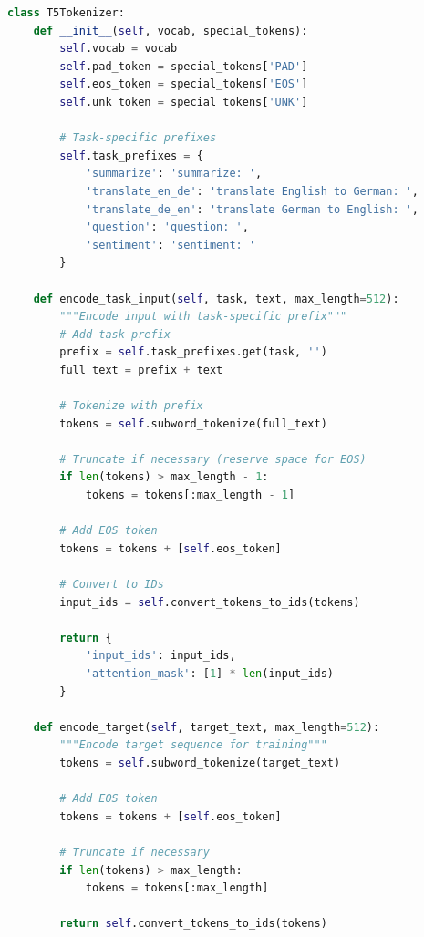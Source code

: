 \begin{lstlisting}[language=Python, caption=T5-style task prefix insertion]
class T5Tokenizer:
    def __init__(self, vocab, special_tokens):
        self.vocab = vocab
        self.pad_token = special_tokens['PAD']
        self.eos_token = special_tokens['EOS']
        self.unk_token = special_tokens['UNK']
        
        # Task-specific prefixes
        self.task_prefixes = {
            'summarize': 'summarize: ',
            'translate_en_de': 'translate English to German: ',
            'translate_de_en': 'translate German to English: ',
            'question': 'question: ',
            'sentiment': 'sentiment: '
        }
    
    def encode_task_input(self, task, text, max_length=512):
        """Encode input with task-specific prefix"""
        # Add task prefix
        prefix = self.task_prefixes.get(task, '')
        full_text = prefix + text
        
        # Tokenize with prefix
        tokens = self.subword_tokenize(full_text)
        
        # Truncate if necessary (reserve space for EOS)
        if len(tokens) > max_length - 1:
            tokens = tokens[:max_length - 1]
        
        # Add EOS token
        tokens = tokens + [self.eos_token]
        
        # Convert to IDs
        input_ids = self.convert_tokens_to_ids(tokens)
        
        return {
            'input_ids': input_ids,
            'attention_mask': [1] * len(input_ids)
        }
    
    def encode_target(self, target_text, max_length=512):
        """Encode target sequence for training"""
        tokens = self.subword_tokenize(target_text)
        
        # Add EOS token
        tokens = tokens + [self.eos_token]
        
        # Truncate if necessary
        if len(tokens) > max_length:
            tokens = tokens[:max_length]
            
        return self.convert_tokens_to_ids(tokens)
\end{lstlisting}

